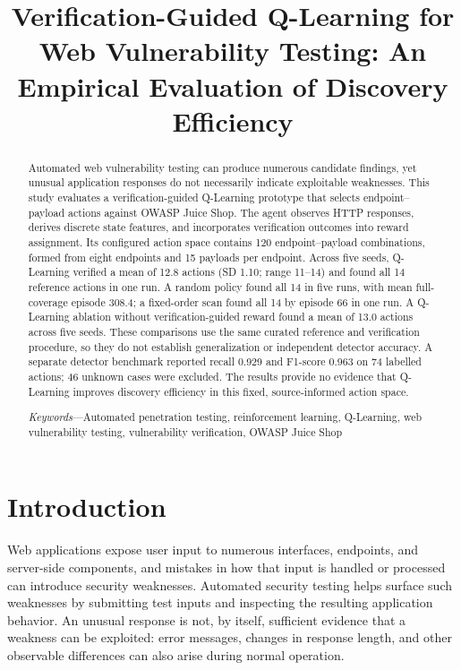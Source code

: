 \documentclass[conference, a4paper]{IEEEtran}
\title{
Verification-Guided Q-Learning for Web Vulnerability Testing:
An Empirical Evaluation of Discovery Efficiency
}
\author{
\IEEEauthorblockN{Kevin Imanuel Setiawan}
\IEEEauthorblockA{
Program Studi Teknologi Informasi, Fakultas Informatika\\
Telkom University Surabaya\\
Surabaya, Indonesia
}
}
\begin{document}
\maketitle

\begin{abstract}
Automated web vulnerability testing can produce numerous
candidate findings, yet unusual application responses do not
necessarily indicate exploitable weaknesses. This study
evaluates a verification-guided Q-Learning prototype that
selects endpoint--payload actions against OWASP Juice Shop.
The agent observes HTTP responses, derives discrete state
features, and incorporates verification outcomes into reward
assignment. Its configured action space contains 120
endpoint--payload combinations, formed from eight endpoints
and 15 payloads per endpoint. Across five seeds, Q-Learning
verified a mean of 12.8 actions (SD 1.10; range 11--14) and
found all 14 reference actions in one run. A random policy found
all 14 in five runs, with mean full-coverage episode 308.4; a
fixed-order scan found all 14 by episode 66 in one run. A
Q-Learning ablation without verification-guided reward found a
mean of 13.0 actions across five seeds. These comparisons use
the same curated reference and verification procedure, so they
do not establish generalization or independent detector accuracy.
A separate detector benchmark reported recall 0.929 and F1-score
0.963 on 74 labelled actions; 46 unknown cases were excluded.
The results provide no evidence that Q-Learning improves
discovery efficiency in this fixed, source-informed action space.

\noindent\textit{Keywords}---Automated penetration testing, reinforcement learning,
Q-Learning, web vulnerability testing, vulnerability
verification, OWASP Juice Shop
\end{abstract}
\section{Introduction}

Web applications expose user input to numerous interfaces,
endpoints, and server-side components, and mistakes in how that
input is handled or processed can introduce security weaknesses.
Automated security testing helps surface such weaknesses by
submitting test inputs and inspecting the resulting application
behavior. An unusual response is not, by itself, sufficient
evidence that a weakness can be exploited: error messages,
changes in response length, and other observable differences can
also arise during normal operation.
\end{document}
